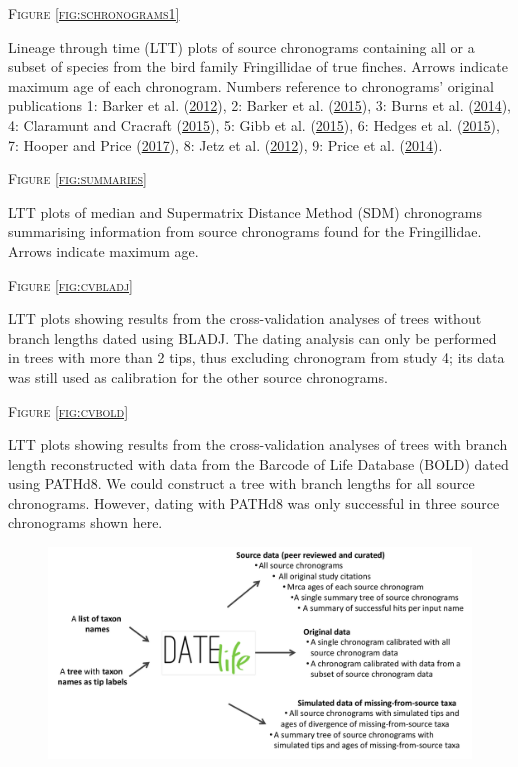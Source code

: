 \documentclass[]{article}
\begin{document}
\begin{center}
\textsc{Figure \ref{fig:schronograms1}}
\end{center}
Lineage through time (LTT) plots of source chronograms containing all or a subset of species from the bird family Fringillidae of true finches. Arrows indicate maximum age of each chronogram. Numbers reference to chronograms' original publications 1: Barker et al. (\protect\hyperlink{ref-barker2012going}{2012}), 2: Barker et al. (\protect\hyperlink{ref-barker2015new}{2015}), 3: Burns et al. (\protect\hyperlink{ref-burns2014phylogenetics}{2014}), 4: Claramunt and Cracraft (\protect\hyperlink{ref-claramunt2015new}{2015}), 5: Gibb et al. (\protect\hyperlink{ref-gibb2015new}{2015}), 6: Hedges et al. (\protect\hyperlink{ref-Hedges2015}{2015}), 7: Hooper and Price (\protect\hyperlink{ref-hooper2017chromosomal}{2017}), 8: Jetz et al. (\protect\hyperlink{ref-Jetz2012}{2012}), 9: Price et al. (\protect\hyperlink{ref-price2014niche}{2014}).

\begin{center}
\textsc{Figure \ref{fig:summaries}}
\end{center}
LTT plots of median and Supermatrix Distance Method (SDM) chronograms summarising information from source chronograms found for the Fringillidae. Arrows indicate maximum age.

\begin{center}
\textsc{Figure \ref{fig:cvbladj}}
\end{center}
LTT plots showing results from the cross-validation analyses of trees without branch lengths dated using BLADJ. The dating analysis can only be performed in trees with more than 2 tips, thus excluding chronogram from study 4; its data was still used as calibration for the other source chronograms.

\begin{center}
\textsc{Figure \ref{fig:cvbold}}
\end{center}
LTT plots showing results from the cross-validation analyses of trees with branch length reconstructed with data from the Barcode of Life Database (BOLD) dated using PATHd8. We could construct a tree with branch lengths for all source chronograms. However, dating with PATHd8 was only successful in three source chronograms shown here.

\newpage

\begin{figure}[!h]
\includegraphics{Fig1.pdf}
\caption{}
\label{fig:workflow}
\end{figure}
\end{document}
